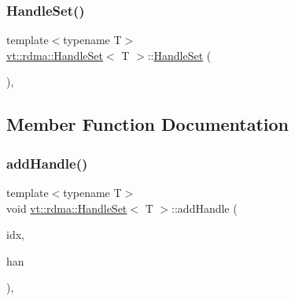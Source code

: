 \subsubsection{\texorpdfstring{Handle\+Set()}{HandleSet()}\hspace{0.1cm}{\footnotesize\ttfamily [4/4]}}
{\footnotesize\ttfamily template$<$typename T$>$ \\
\hyperlink{structvt_1_1rdma_1_1_handle_set}{vt\+::rdma\+::\+Handle\+Set}$<$ T $>$\+::\hyperlink{structvt_1_1rdma_1_1_handle_set}{Handle\+Set} (\begin{DoxyParamCaption}\item[{\hyperlink{structvt_1_1rdma_1_1_handle_set_1_1_build_set_tag_type}{Build\+Set\+Tag\+Type}}]{ }\end{DoxyParamCaption})\hspace{0.3cm}{\ttfamily [inline]}, {\ttfamily [private]}}



\subsection{Member Function Documentation}
\mbox{\label{structvt_1_1rdma_1_1_handle_set_a870d2596189da0477b434b268e1c2137}} 
\subsubsection{\texorpdfstring{add\+Handle()}{addHandle()}}
{\footnotesize\ttfamily template$<$typename T$>$ \\
void \hyperlink{structvt_1_1rdma_1_1_handle_set}{vt\+::rdma\+::\+Handle\+Set}$<$ T $>$\+::add\+Handle (\begin{DoxyParamCaption}\item[{\hyperlink{structvt_1_1rdma_1_1_handle_set_aa0dbb6a47c459fb4290f0ca96e573097}{Index\+Type} const \&}]{idx,  }\item[{\hyperlink{structvt_1_1rdma_1_1_handle_set_ab3a698ee86bae503dfa84617205b2dd9}{Handle\+Type}}]{han }\end{DoxyParamCaption})\hspace{0.3cm}{\ttfamily [inline]}, {\ttfamily [private]}}

\mbox{\label{structvt_1_1rdma_1_1_handle_set_ad5b51f17e95368c892480eebc7d4aa76}} 
